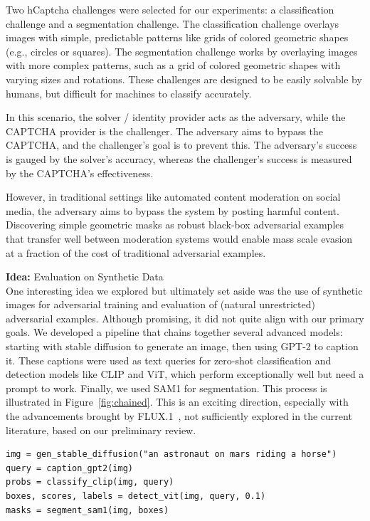 \documentclass[a4paper, oneside]{discothesis}
\begin{document}
Two hCaptcha challenges were selected for our experiments: a classification challenge and a segmentation challenge. The classification challenge overlays images with simple, predictable patterns like grids of colored geometric shapes (e.g., circles or squares). The segmentation challenge works by overlaying images with more complex patterns, such as a grid of colored geometric shapes with varying sizes and rotations. These challenges are designed to be easily solvable by humans, but difficult for machines to classify accurately.

In this scenario, the solver / identity provider acts as the adversary, while the CAPTCHA provider is the challenger. The adversary aims to bypass the CAPTCHA, and the challenger's goal is to prevent this. The adversary's success is gauged by the solver's accuracy, whereas the challenger's success is measured by the CAPTCHA's effectiveness. 

However, in traditional settings like automated content moderation on social media, the adversary aims to bypass the system by posting harmful content. Discovering simple geometric masks as robust black-box adversarial examples that transfer well between moderation systems would enable mass scale evasion at a fraction of the cost of traditional adversarial examples.

\begin{highlightbox}
	\textbf{Idea:} Evaluation on Synthetic Data \\

	One interesting idea we explored but ultimately set aside was the use of synthetic images for adversarial training and evaluation of (natural unrestricted) adversarial examples. Although promising, it did not quite align with our primary goals. We developed a pipeline that chains together several advanced models: starting with stable diffusion to generate an image, then using GPT-2 to caption it. These captions were used as text queries for zero-shot classification and detection models like CLIP and ViT, which perform exceptionally well but need a prompt to work. Finally, we used SAM1 for segmentation. This process is illustrated in Figure~\ref{fig:chained}. This is an exciting direction, especially with the advancements brought by FLUX.1~\cite{BlackForestLabs2024FLUX}, not sufficiently explored in the current literature, based on our preliminary review. \\

\begin{verbatim}
img = gen_stable_diffusion("an astronaut on mars riding a horse")
query = caption_gpt2(img)
probs = classify_clip(img, query)
boxes, scores, labels = detect_vit(img, query, 0.1)
masks = segment_sam1(img, boxes)
\end{verbatim}
\end{highlightbox}
\end{document}
